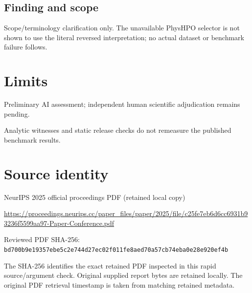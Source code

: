 \documentclass[11pt]{article}
\begin{document}
\subsection*{Finding and scope}

Scope/terminology clarification only. The unavailable PhysHPO selector is not shown to use the literal reversed interpretation; no actual dataset or benchmark failure follows.

\section*{Limits}

Preliminary AI assessment; independent human scientific adjudication remains pending.\par

Analytic witnesses and static release checks do not remeasure the published benchmark results.\par

\section*{Source identity}

NeurIPS 2025 official proceedings PDF (retained local copy)

\url{https://proceedings.neurips.cc/paper_files/paper/2025/file/c25fe7eb6d6cc6931b93236f5599aa97-Paper-Conference.pdf}

Reviewed PDF SHA-256: \nolinkurl{bd700b9e19357ebe5c2e744d27ec02f011fe8aed70a57cb74eba0e28e920ef4b}

The SHA-256 identifies the exact retained PDF inspected in this rapid source/argument check. Original supplied report bytes are retained locally. The original PDF retrieval timestamp is taken from matching retained metadata.
\end{document}
